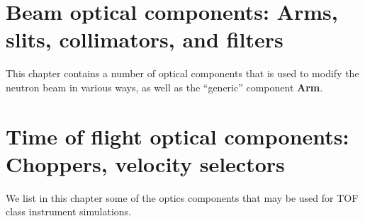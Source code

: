 
\chapter{Beam optical components:
Arms, slits, collimators, and filters}
This chapter contains a number of optical components
that is used to modify the neutron beam in various ways,
as well as the ``generic'' component {\bf Arm}.



\newpage


\newpage


\newpage


\newpage


\newpage


\newpage


\chapter{Time of flight optical components:
Choppers, velocity selectors}
We list in this chapter some of the optics components that may be used for TOF class instrument simulations.

\newpage


%

\newpage


\newpage

